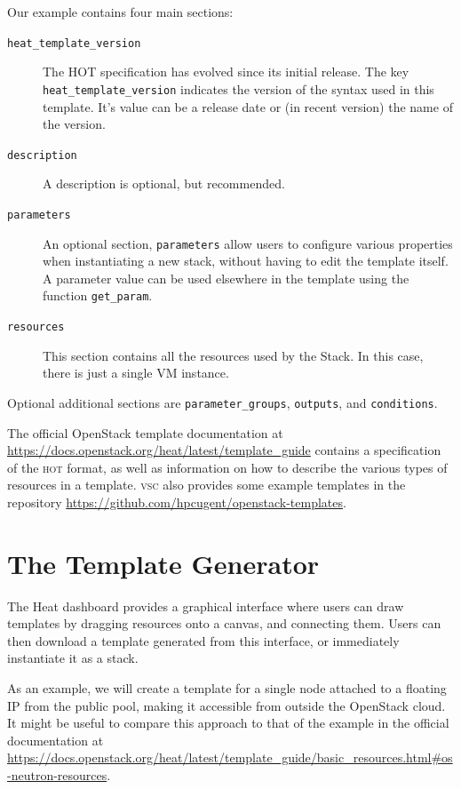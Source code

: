Our example contains four main sections:
\begin{description}
\item[\texttt{heat\_template\_version}] The \textsc{HOT} specification
  has evolved since its initial release.  The key
  \lstinline{heat_template_version} indicates the version of the
  syntax used in this template.  It's value can be a release date or
  (in recent version) the name of the version.
\item[\texttt{description}] A description is optional, but
  recommended.
\item[\texttt{parameters}] An optional section, \lstinline{parameters}
  allow users to configure various properties when instantiating a new
  stack, without having to edit the template itself.  A parameter
  value can be used elsewhere in the template using the function
  \lstinline{get_param}.
\item[\texttt{resources}] This section contains all the resources used
  by the Stack.  In this case, there is just a single VM instance.
\end{description}
Optional additional sections are \lstinline{parameter_groups},
\lstinline{outputs}, and \lstinline{conditions}.

The official OpenStack template documentation at
\url{https://docs.openstack.org/heat/latest/template_guide} contains a
specification of the \textsc{hot} format, as well as information on
how to describe the various types of resources in a template.
\textsc{vsc} also provides some example templates in the repository
\url{https://github.com/hpcugent/openstack-templates}.

\section{The Template Generator}\label{sec:template-generator}
The Heat dashboard provides a graphical interface where users can draw
templates by dragging resources onto a canvas, and connecting them.
Users can then download a template generated from this interface, or
immediately instantiate it as a stack.

As an example, we will create a template for a single node attached to
a floating IP from the public pool, making it accessible from outside
the OpenStack cloud.  It might be useful to compare this approach to
that of the example in the official documentation at
\url{https://docs.openstack.org/heat/latest/template_guide/basic_resources.html#os-neutron-resources}.

